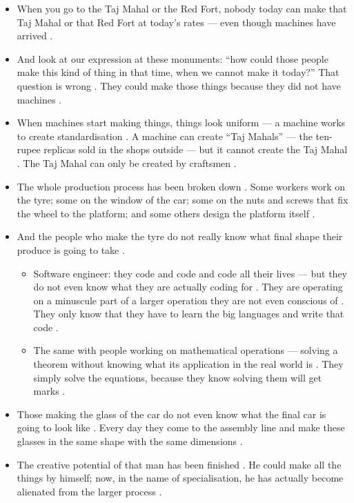 \begin{ExampleBox}
\begin{itemize}
    \item When you go to the Taj Mahal or the Red Fort, nobody today can make that Taj Mahal or that Red Fort at today's rates --- even though machines have arrived .
    \item And look at our expression at these monuments: ``how could those people make this kind of thing in that time, when we cannot make it today?'' That question is wrong . They could make those things because they did not have machines .
    \item When machines start making things, things look uniform --- a machine works to create standardisation . A machine can create ``Taj Mahals'' --- the ten-rupee replicas sold in the shops outside --- but it cannot create the Taj Mahal . The Taj Mahal can only be created by craftsmen .
\end{itemize}
\end{ExampleBox}

\begin{itemize}
    \item The whole production process has been broken down . Some workers work on the tyre; some on the window of the car; some on the nuts and screws that fix the wheel to the platform; and some others design the platform itself .
    \item And the people who make the tyre do not really know what final shape their produce is going to take .
    \begin{itemize}
        \item Software engineer: they code and code and code all their lives --- but they do not even know what they are actually coding for . They are operating on a minuscule part of a larger operation they are not even conscious of . They only know that they have to learn the big languages and write that code .
        \item The same with people working on mathematical operations --- solving a theorem without knowing what its application in the real world is . They simply solve the equations, because they know solving them will get marks .
    \end{itemize}
    \item Those making the glass of the car do not even know what the final car is going to look like . Every day they come to the assembly line and make these glasses in the same shape with the same dimensions .
    \item The creative potential of that man has been finished . He could make all the things by himself; now, in the name of specialisation, he has actually become alienated from the larger process .
\end{itemize}

